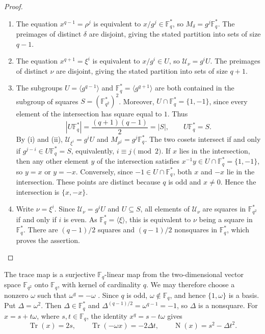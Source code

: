 \documentclass[preprint,12pt,a4paper]{elsarticle}
\newcommand{\Tr}{\operatorname{Tr}}
\newcommand{\N}{\operatorname{N}}
\begin{document}
\begin{proof}
\begin{enumerate}[label=\textup{(\roman*)}]
\item The equation $x^{q-1}=\rho^j$ is equivalent to $x/g^j\in\mathbb F_q^{*}$, so $M_\delta=g^j\mathbb F_q^{*}$. The preimages of distinct $\delta$ are disjoint, giving the stated partition into sets of size $q-1$.

\item The equation $x^{q+1}=\xi^i$ is equivalent to $x/g^i\in U$, so $\mathcal U_\nu=g^iU$. The preimages of distinct $\nu$ are disjoint, giving the stated partition into sets of size $q+1$.

\item The subgroups $U=\langle g^{q-1}\rangle$ and $\mathbb F_q^{*}=\langle g^{q+1}\rangle$ are both contained in the subgroup of squares $S=(\mathbb F_{q^2}^{*})^2$. Moreover, $U\cap\mathbb F_q^{*}=\{1,-1\}$, since every element of the intersection has square equal to $1$. Thus
\[
 |U\mathbb F_q^{*}|=\frac{(q+1)(q-1)}{2}=|S|,
 \qquad U\mathbb F_q^{*}=S.
\]
By (i) and (ii), $\mathcal U_{\xi^i}=g^iU$ and $M_{\rho^j}=g^j\mathbb F_q^{*}$. The two cosets intersect if and only if $g^{j-i}\in U\mathbb F_q^{*}=S$, equivalently, $i\equiv j\pmod2$. If $x$ lies in the intersection, then any other element $y$ of the intersection satisfies $x^{-1}y\in U\cap\mathbb F_q^{*}=\{1,-1\}$, so $y=x$ or $y=-x$. Conversely, since $-1\in U\cap\mathbb F_q^{*}$, both $x$ and $-x$ lie in the intersection. These points are distinct because $q$ is odd and $x\ne0$. Hence the intersection is $\{x,-x\}$.

\item Write $\nu=\xi^i$. Since $\mathcal U_\nu=g^iU$ and $U\subseteq S$, all elements of $\mathcal U_\nu$ are squares in $\mathbb F_{q^2}^{*}$ if and only if $i$ is even. As $\mathbb F_q^{*}=\langle\xi\rangle$, this is equivalent to $\nu$ being a square in $\mathbb F_q^{*}$. There are $(q-1)/2$ squares and $(q-1)/2$ nonsquares in $\mathbb F_q^{*}$, which proves the assertion.
\end{enumerate}
\end{proof}

The trace map is a surjective $\mathbb F_q$-linear map from the two-dimensional vector space $\mathbb F_{q^2}$ onto $\mathbb F_q$, with kernel of cardinality $q$. We may therefore choose a nonzero $\omega$ such that $\omega^q=-\omega$ \cite[Chapter~2]{LidlNiederreiter1997}. Since $q$ is odd, $\omega\notin\mathbb F_q$, and hence $\{1,\omega\}$ is a basis. Put $\Delta=\omega^2$. Then $\Delta\in\mathbb F_q^{*}$ and $\Delta^{(q-1)/2}=\omega^{q-1}=-1$, so $\Delta$ is a nonsquare. For $x=s+t\omega$, where $s,t\in\mathbb F_q$, the identity $x^q=s-t\omega$ gives
\[
 \Tr(x)=2s,\qquad \Tr(-\omega x)=-2\Delta t,
 \qquad \N(x)=s^2-\Delta t^2.
\]
\end{document}
